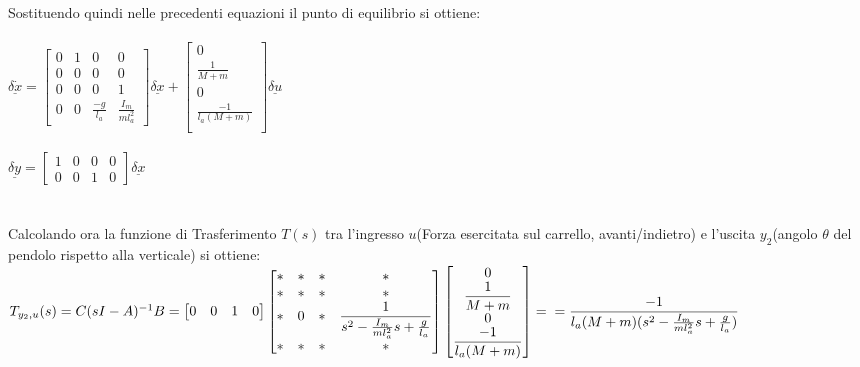 Sostituendo quindi nelle precedenti equazioni il punto di equilibrio si ottiene:\\\\
$\underline{\delta\dot{x}}=
\begin{bmatrix}
0&1&0&0\\
0&0&0&0\\
0&0&0&1\\
0&0&\displaystyle\frac{-g}{l_a}&\displaystyle\frac{I_m}{ml_a^2}
\end{bmatrix}
\underline{\delta x}+
\begin{bmatrix}
0\\
\displaystyle\frac{1}{M+m}\\
0\\
\displaystyle\frac{-1}{l_a(M+m)}\\
\end{bmatrix}
\underline{\delta u}
$\\\\
$\underline{\delta y}=
\begin{bmatrix}
1&0&0&0\\
0&0&1&0
\end{bmatrix}
\underline{\delta x}
$\\\\\\
Calcolando ora la funzione di Trasferimento $T(s)$ tra l'ingresso $u$(Forza esercitata sul carrello,
avanti/indietro) e l'uscita $y_2$(angolo $\theta$ del pendolo rispetto alla verticale) si ottiene:\\
$T_{y_2,u}(s)=C(sI-A)^{-1}B=
\begin{bmatrix}
0&0&1&0
\end{bmatrix}
\begin{bmatrix}
*&*&*&*\\
*&*&*&*\\
*&0&*&\displaystyle\frac{1}{s^2-\frac{I_m}{ml_a^2}s+\frac{g}{l_a}}\\
*&*&*&*
\end{bmatrix}
\begin{bmatrix}
0\\
\displaystyle\frac{1}{M+m}\\
0\\
\displaystyle\frac{-1}{l_a(M+m)}\\
\end{bmatrix} = \\
=\displaystyle\frac{-1}{l_a(M+m)(s^2-\frac{I_m}{ml_a^2}s+\frac{g}{l_a})}
$

